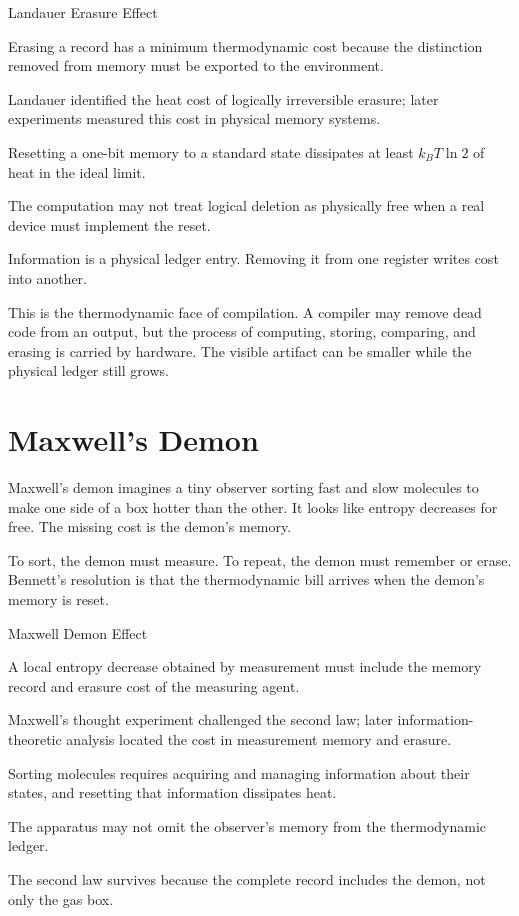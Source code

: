 \begin{phenom}{Landauer Erasure Effect}
\label{ph:landauer-erasure-effect}

\PhStatement Erasing a record has a minimum thermodynamic cost because the
distinction removed from memory must be exported to the environment.

\PhOrigin Landauer identified the heat cost of logically irreversible erasure;
later experiments measured this cost in physical memory systems.

\PhObservation Resetting a one-bit memory to a standard state dissipates at
least $k_B T \ln 2$ of heat in the ideal limit.

\PhConstraint The computation may not treat logical deletion as physically free
when a real device must implement the reset.

\PhConsequence Information is a physical ledger entry. Removing it from one
register writes cost into another.

\end{phenom}

This is the thermodynamic face of compilation. A compiler may remove dead code
from an output, but the process of computing, storing, comparing, and erasing
is carried by hardware. The visible artifact can be smaller while the physical
ledger still grows.

\section{Maxwell's Demon}
\label{se:maxwells-demon}

Maxwell's demon imagines a tiny observer sorting fast and slow molecules to
make one side of a box hotter than the other. It looks like entropy decreases
for free. The missing cost is the demon's memory.

To sort, the demon must measure. To repeat, the demon must remember or erase.
Bennett's resolution is that the thermodynamic bill arrives when the demon's
memory is reset.

\begin{phenom}{Maxwell Demon Effect}
\label{ph:maxwell-demon-effect}

\PhStatement A local entropy decrease obtained by measurement must include the
memory record and erasure cost of the measuring agent.

\PhOrigin Maxwell's thought experiment challenged the second law; later
information-theoretic analysis located the cost in measurement memory and
erasure.

\PhObservation Sorting molecules requires acquiring and managing information
about their states, and resetting that information dissipates heat.

\PhConstraint The apparatus may not omit the observer's memory from the
thermodynamic ledger.

\PhConsequence The second law survives because the complete record includes the
demon, not only the gas box.

\end{phenom}

